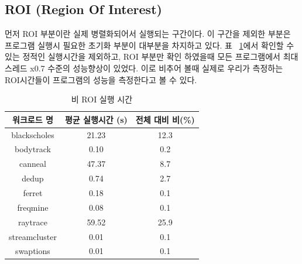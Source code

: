 \documentclass{kcc}
\begin{document}
\subsection{ROI (Region Of Interest)}
 먼저 ROI 부분이란 실제 병렬화되어서 실행되는 구간이다. 이 구간을 제외한 부분은 프로그램 실행시 필요한 초기화 부분이 대부분을 차지하고 있다. 표 ~\ref{tab:ROI_ratio}에서 확인할 수 있는 정적인 실행시간을 제외하고, ROI 부분만 확인 하였을때 모든 프로그램에서 최대 스레드 x0.7 수준의 성능향상이 있었다. 이로 비추어 볼때 실제로 우리가 측정하는 ROI시간들이 프로그램의 성능을 측정한다고 볼 수 있다.
\begin{table}
\caption{비 ROI 실행 시간} 
\label{tab:ROI_ratio}
\centering
\begin{tabular}{c|c|c}
\hline
워크로드 명 & 평균 실행시간 (s) & 전체 대비 비(\%) \\ \hline
blackscholes & 21.23 & 12.3 \\ \hline
bodytrack & 0.10 & 0.2 \\ \hline
canneal & 47.37 & 8.7 \\ \hline
dedup & 0.74 & 2.7\\ \hline
ferret & 0.18 & 0.1\\ \hline
freqmine & 0.08 & 0.1\\ \hline
raytrace & 59.52 & 25.9\\ \hline
streamcluster & 0.01 & 0.1\\ \hline
swaptions & 0.01 & 0.1\\ \hline
\end{tabular}
\end{table}
\end{document}
